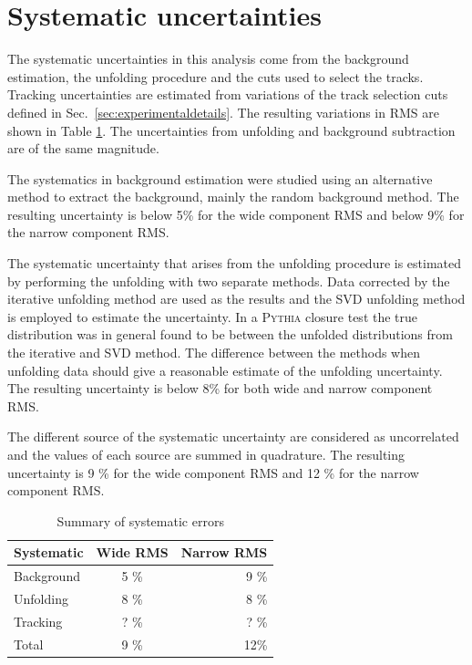\section{Systematic uncertainties}
\label{sec:systematicerrors}
The systematic uncertainties in this analysis come from the background estimation, the unfolding procedure and the cuts used to select the tracks. Tracking uncertainties are estimated from variations of the track selection cuts defined in Sec.~\ref{sec:experimentaldetails}. The resulting variations in RMS are shown in Table \ref{tab:systematics}. The uncertainties from unfolding and background subtraction are of the same magnitude. 

The systematics in background estimation were studied using an alternative method to extract the background, mainly the random background method. The resulting uncertainty is below 5\% for the wide component RMS and below 9\% for the narrow component RMS. 

The systematic uncertainty that arises from the unfolding procedure is estimated by performing the unfolding with two separate methods. Data corrected by the iterative unfolding method are used as the results and the SVD unfolding method is employed to estimate the uncertainty. In a \textsc{Pythia} closure test the true distribution was in general found to be between the unfolded distributions from the iterative and SVD method. The difference between the methods when unfolding data should give a reasonable estimate of the unfolding uncertainty. The resulting uncertainty is below 8\% for both wide and narrow component RMS.

The different source of the systematic uncertainty are considered as uncorrelated and the values of each source are summed in quadrature. The resulting uncertainty is 9 \% for the wide component RMS and 12 \% for the narrow component RMS. 

\begin{table}[htb]
\centering
\caption{Summary of systematic errors}
\label{tab:systematics}
\begin{tabular}{ l | c | r }
  Systematic & Wide RMS & Narrow RMS \\
    \hline			
  Background & 5 \% & 9 \% \\
  Unfolding & 8 \% & 8 \% \\
  Tracking & ? \% & ? \% \\
  Total & 9 \% & 12\% \\
  \hline
  \end{tabular}
  \end{table}


